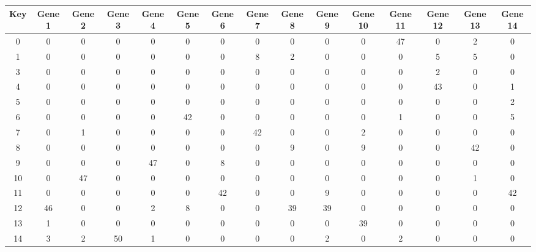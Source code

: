 \begin{tabular}{|c|c|c|c|c|c|c|c|c|c|c|c|c|c|c|}
\hline
Key & Gene 1 & Gene 2 & Gene 3 & Gene 4 & Gene 5 & Gene 6 & Gene 7 & Gene 8 & Gene 9 & Gene 10 & Gene 11 & Gene 12 & Gene 13 & Gene 14 \\
\hline
0 & 0 & 0 & 0 & 0 & 0 & 0 & 0 & 0 & 0 & 0 & 47 & 0 & 2 & 0 \\
1 & 0 & 0 & 0 & 0 & 0 & 0 & 8 & 2 & 0 & 0 & 0 & 5 & 5 & 0 \\
3 & 0 & 0 & 0 & 0 & 0 & 0 & 0 & 0 & 0 & 0 & 0 & 2 & 0 & 0 \\
4 & 0 & 0 & 0 & 0 & 0 & 0 & 0 & 0 & 0 & 0 & 0 & 43 & 0 & 1 \\
5 & 0 & 0 & 0 & 0 & 0 & 0 & 0 & 0 & 0 & 0 & 0 & 0 & 0 & 2 \\
6 & 0 & 0 & 0 & 0 & 42 & 0 & 0 & 0 & 0 & 0 & 1 & 0 & 0 & 5 \\
7 & 0 & 1 & 0 & 0 & 0 & 0 & 42 & 0 & 0 & 2 & 0 & 0 & 0 & 0 \\
8 & 0 & 0 & 0 & 0 & 0 & 0 & 0 & 9 & 0 & 9 & 0 & 0 & 42 & 0 \\
9 & 0 & 0 & 0 & 47 & 0 & 8 & 0 & 0 & 0 & 0 & 0 & 0 & 0 & 0 \\
10 & 0 & 47 & 0 & 0 & 0 & 0 & 0 & 0 & 0 & 0 & 0 & 0 & 1 & 0 \\
11 & 0 & 0 & 0 & 0 & 0 & 42 & 0 & 0 & 9 & 0 & 0 & 0 & 0 & 42 \\
12 & 46 & 0 & 0 & 2 & 8 & 0 & 0 & 39 & 39 & 0 & 0 & 0 & 0 & 0 \\
13 & 1 & 0 & 0 & 0 & 0 & 0 & 0 & 0 & 0 & 39 & 0 & 0 & 0 & 0 \\
14 & 3 & 2 & 50 & 1 & 0 & 0 & 0 & 0 & 2 & 0 & 2 & 0 & 0 & 0 \\
\hline
\end{tabular}